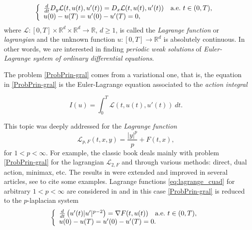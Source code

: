 \documentclass[twoside]{elsarticle}
\theoremstyle{remark}
\newcommand{\rr}{\mathbb{R}}
\renewcommand{\geq}{\geqslant}
\newcounter{example}
\begin{document}
\begin{equation}\label{ProbPrin-gral}
    \left\{%
\begin{array}{ll}
  \frac{d}{dt} D_{y}\mathcal{L}(t,u(t),u'(t))= D_{x}\mathcal{L}(t,u(t),u'(t)) \quad \hbox{a.e.}\ t \in (0,T),\\
    u(0)-u(T)=u'(0)-u'(T)=0,
\end{array}%
\right.
\end{equation}
where $\mathcal{L}:[0,T]\times\rr^d\times\rr^d\to\rr$, $d\geq 1$, is called the \emph{Lagrange function} or \emph{lagrangian} and the unknown function  $u:[0,T]\to\rr^d$ is absolutely continuous. In other words, we are interested in  finding \emph{periodic weak solutions} of \emph{Euler-Lagrange system of ordinary differential equations}.

The problem \eqref{ProbPrin-gral} comes from a variational one, that is,  the equation in  \eqref{ProbPrin-gral} is the Euler-Lagrange equation associated to the \emph{action integral}

\begin{equation}\label{integral_accion}
I(u)=\int_{0}^T \mathcal{L}(t,u(t),u'(t))\ dt.
\end{equation}




This topic was deeply addressed for the \emph{Lagrange function}
\begin{equation}\label{eq:lagrange_cuad}
\mathcal{L}_{p,F}(t,x,y)=\frac{|y|^p}{p}+F(t,x),
\end{equation}
for $1<p<\infty$. For example, the classic book  \cite{mawhin2010critical} deals mainly with problem \eqref{ProbPrin-gral} for the lagrangian $\mathcal{L}_{2,F}$ and through various methods: direct, dual action, minimax, etc. The results in \cite{mawhin2010critical} were extended and improved in several articles, see  \cite{tang1995periodic,tang1998periodic,wu1999periodic,tang2001periodic,zhao2004periodic}  to cite some examples. Lagrange functions \eqref{eq:lagrange_cuad} for arbitrary $1<p<\infty$ are considered in  \cite{Tian2007192,tang2010periodic} and in this case \eqref{ProbPrin-gral}  is reduced to the $p$-laplacian system
\begin{equation*}\label{ProbP-lapla}
    \left\{%
\begin{array}{ll}
   \frac{d}{dt}\left(u'(t)|u'|^{p-2}\right) = \nabla F(t,u(t)) \quad \hbox{a.e.}\ t \in (0,T),\\
    u(0)-u(T)=u'(0)-u'(T)=0.
\end{array}%
\right.
\end{equation*}
\end{document}
